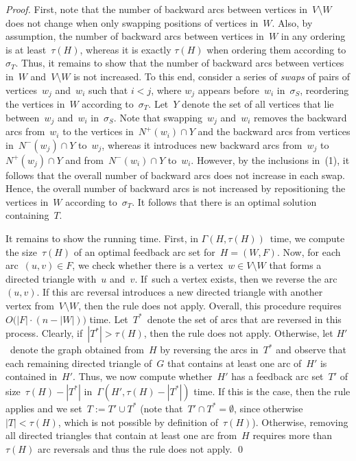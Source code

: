 \documentclass[envcountsame,numbook,smallextended]{svjour3}
\numberwithin{equation}{section}
\numberwithin{figure}{section}
\newcommand{\Time}{\ensuremath{\Gamma}}
\begin{document}
\begin{proof}
  First, note that the number of backward arcs
  between vertices in~$V\setminus W$
  does not change
  when only swapping positions of vertices in~\(W\).
  Also, by assumption,
  the number of backward arcs between vertices in~$W$
  in any ordering is at least~$\tau(H)$,
  whereas it is exactly \(\tau(H)\)
  when ordering them according to~\(\sigma_T\).
  Thus,
  it remains to show that the number of backward arcs
  between vertices in~$W$ and~$V\setminus W$
  is not increased.
  To this end,
  consider a series of \emph{swaps}
  of pairs of vertices~$w_j$ and~$w_i$ such that $i<j$,
  where $w_j$ appears before~$w_i$ in~$\sigma_S$,
  reordering the vertices in~$W$ according to~$\sigma_T$.
  Let~$Y$ denote the set of all vertices that lie between~$w_j$ and~$w_i$ in~$\sigma_S$.
  Note that swapping~$w_j$ and~$w_i$ removes the backward arcs from~$w_i$ to the vertices in~$N^+(w_i)\cap Y$ and the backward arcs from vertices in~$N^-(w_j)\cap Y$ to~$w_j$, whereas it introduces new backward arcs from~$w_j$ to~$N^+(w_j)\cap Y$ and from~$N^-(w_i)\cap Y$ to~$w_i$.
  However, by the inclusions in~(1), it follows that the overall number of backward arcs does not increase in each swap.
  Hence, the overall number of backward arcs is not increased by repositioning the vertices in~$W$
  according to~$\sigma_T$. It follows that there is an optimal solution containing~$T$.
    
  It remains to show the running time.
  First,
  in $\Time(H,\tau(H))$~time,
  we compute the size~$\tau(H)$
  of an optimal feedback arc set for~$H=(W,F)$.
  Now,
  for each arc~$(u,v)\in F$,
  we check whether there is a vertex~$w\in V\setminus W$
  that forms a directed triangle
  with~$u$ and~$v$.
  If~such a vertex exists,
  then we reverse the arc~$(u,v)$.
  If this arc reversal introduces a new directed triangle
  with another vertex from~$V\setminus W$,
  then the rule does not apply.
  Overall, this procedure requires~$O\big(|F|\cdot(n-|W|)\big)$ time.
  Let~$T^*$~denote the set of arcs that are reversed in this process. Clearly, if~$|T^*| > \tau(H)$, then the rule does not apply. Otherwise, let $H'$~denote the graph obtained from~$H$ by reversing the arcs in~$T^*$ and observe that each remaining directed triangle of~$G$ that contains at least one arc of~$H'$ is contained in~$H'$.
  Thus, we now compute whether~$H'$ has a feedback arc set~$T'$ of size~$\tau(H)-|T^*|$ in~$\Time(H',\tau(H)-|T^*|)$ time. If this is the case, then the rule applies
  and we set~$T := T' \cup T^*$ (note that~$T'\cap T^*=\emptyset$, since otherwise~$|T|< \tau(H)$, which is not possible by definition of~$\tau(H)$).
  Otherwise, removing all directed triangles that contain at least one arc from~$H$ requires more than~$\tau(H)$ arc reversals and thus the rule does not apply.
\qed\end{proof}
\end{document}
